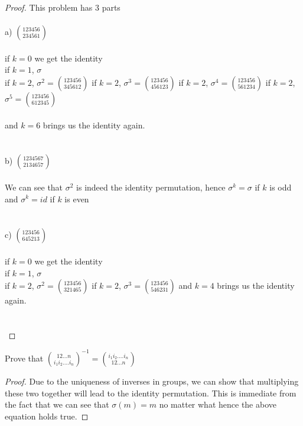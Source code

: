 \documentclass[12pt]{article}
\newenvironment{problem}[2][Problem]{\begin{trivlist}
\item[\hskip \labelsep {\bfseries #1}\hskip \labelsep {\bfseries #2.}]}{\end{trivlist}}
\begin{document}
\begin{proof}
This problem has 3 parts \\ \\
a) $\displaystyle{1 2 3 4 56   \choose 234561}$ \\ \\
if $k=0$ we get the identity \\ 
if $k = 1$, $\sigma$ \\
if $k=2$, $\sigma^2 = \displaystyle{1 2 3 4 56   \choose 345612}$
if $k=2$, $\sigma^3 = \displaystyle{1 2 3 4 56   \choose 456123}$
if $k=2$, $\sigma^4 = \displaystyle{1 2 3 4 56   \choose 561234}$
if $k=2$, $\sigma^5 = \displaystyle{1 2 3 4 56   \choose 612345}$ \\ \\
and $k=6$ brings us the identity again. \\ \\ \\
b) $\displaystyle{1 2 3 4 567   \choose 2134657}$ \\ \\ 
We can see that $\sigma^2$ is indeed the identity permutation, hence $\sigma^k = \sigma$ if $k$ is odd and $\sigma^k = id$ if $k$ is even \\ \\ \\
c) $\displaystyle{1 2 3 4 56   \choose 645213}$ \\ \\
if $k=0$ we get the identity \\ 
if $k = 1$, $\sigma$ \\
if $k=2$, $\sigma^2 = \displaystyle{1 2 3 4 56   \choose 321465}$
if $k=2$, $\sigma^3 = \displaystyle{1 2 3 4 56   \choose 546231}$
and $k=4$ brings us the identity again. \\ \\ \\
\end{proof}

\begin{problem}{3.1.3}
Prove that $\displaystyle{1 2 ...n \choose i_1 i_2....i_n}^{-1} = \displaystyle{i_1 i_2....i_n \choose 1 2 ...n}$
\end{problem}

\begin{proof}
Due to the uniqueness of inverses in groups, we can show that multiplying these two together will lead to the identity permutation. This is immediate from the fact that we can see that $\sigma(m) = m$ no matter what hence the above equation holds true.
\end{proof}
 
\end{document}
